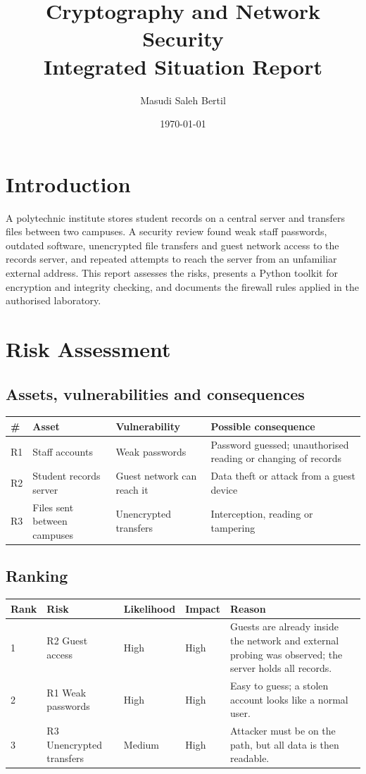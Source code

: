 \documentclass[11pt,a4paper]{article}
\title{Cryptography and Network Security\\Integrated Situation Report}
\author{Masudi Saleh Bertil}
\date{\today}
\begin{document}
\maketitle

\section{Introduction}
A polytechnic institute stores student records on a central server and transfers files between two campuses. A security review found weak staff passwords, outdated software, unencrypted file transfers and guest network access to the records server, and repeated attempts to reach the server from an unfamiliar external address. This report assesses the risks, presents a Python toolkit for encryption and integrity checking, and documents the firewall rules applied in the authorised laboratory.

\section{Risk Assessment}
\subsection{Assets, vulnerabilities and consequences}
\begin{longtable}{p{0.5cm}p{3.5cm}p{4cm}p{6cm}}
\toprule
\# & Asset & Vulnerability & Possible consequence \\ \midrule
R1 & Staff accounts & Weak passwords & Password guessed; unauthorised reading or changing of records \\
R2 & Student records server & Guest network can reach it & Data theft or attack from a guest device \\
R3 & Files sent between campuses & Unencrypted transfers & Interception, reading or tampering \\
\bottomrule
\end{longtable}

\subsection{Ranking}
\begin{longtable}{p{1cm}p{3.5cm}p{1.8cm}p{1.5cm}p{5cm}}
\toprule
Rank & Risk & Likelihood & Impact & Reason \\ \midrule
1 & R2 Guest access & High & High & Guests are already inside the network and external probing was observed; the server holds all records. \\
2 & R1 Weak passwords & High & High & Easy to guess; a stolen account looks like a normal user. \\
3 & R3 Unencrypted transfers & Medium & High & Attacker must be on the path, but all data is then readable. \\
\bottomrule
\end{longtable}
\end{document}
